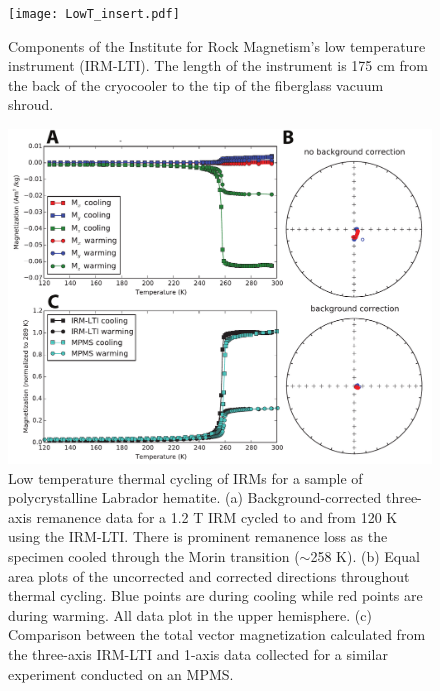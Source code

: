 \documentclass[draft,gc]{AGUTeX}
\begin{document}
\begin{figure}
\noindent\texttt{[image: LowT\_insert.pdf]}
\caption{Components of the Institute for Rock Magnetism's low temperature instrument (IRM-LTI). The length of the instrument is 175 cm from the back of the cryocooler to the tip of the fiberglass vacuum shroud.}
\label{fig:insert_schematic}
\end{figure}

\begin{figure}
\noindent\includegraphics[width=\textwidth]{Hematite1.pdf}
\caption{Low temperature thermal cycling of IRMs for a sample of polycrystalline Labrador hematite. (a) Background-corrected three-axis remanence data for a 1.2 T IRM cycled to and from 120 K using the IRM-LTI. There is prominent remanence loss as the specimen cooled through the Morin transition ($\sim$258 K). (b) Equal area plots of the uncorrected and corrected directions throughout thermal cycling. Blue points are during cooling while red points are during warming. All data plot in the upper hemisphere. (c) Comparison between the total vector magnetization calculated from the three-axis IRM-LTI and 1-axis data collected for a similar experiment conducted on an MPMS.}
\label{fig:hematite}
\end{figure}
\end{document}
